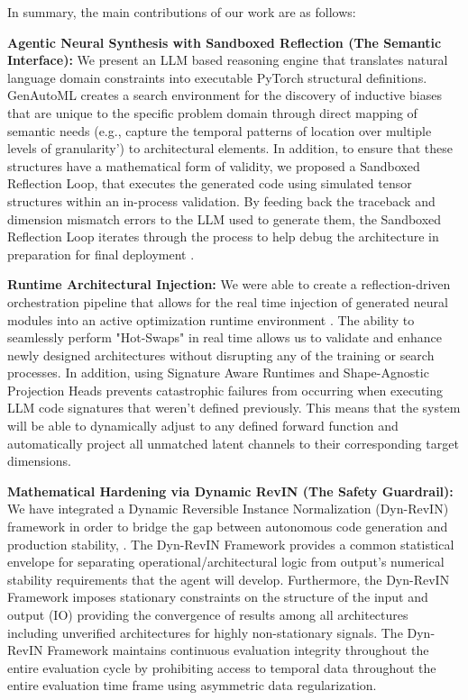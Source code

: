 \documentclass{article}
\begin{document}
In summary, the main contributions of our work are as follows:

\textbf{Agentic Neural Synthesis with Sandboxed Reflection (The Semantic Interface):} We present an LLM based reasoning engine that translates natural language domain constraints into executable PyTorch structural definitions. GenAutoML creates a search environment for the discovery of inductive biases that are unique to the specific problem domain through direct mapping of semantic needs (e.g., capture the temporal patterns of location over multiple levels of granularity') to architectural elements. In addition, to ensure that these structures have a mathematical form of validity, we proposed a Sandboxed Reflection Loop, that executes the generated code using simulated tensor structures within an in-process validation. By feeding back the traceback and dimension mismatch errors to the LLM used to generate them, the Sandboxed Reflection Loop iterates through the process to help debug the architecture in preparation for final deployment \cite{chen2023teaching}.

\textbf{Runtime Architectural Injection:} We were able to create a reflection-driven orchestration pipeline that allows for the real time injection of generated neural modules into an active optimization runtime environment \cite{paszke2019pytorch}. The ability to seamlessly perform "Hot-Swaps" in real time allows us to validate and enhance newly designed architectures without disrupting any of the training or search processes.  In addition, using Signature Aware Runtimes and Shape-Agnostic Projection Heads prevents catastrophic failures from occurring when executing LLM code signatures that weren’t defined previously. This means that the system will be able to dynamically adjust to any defined forward function and automatically project all unmatched latent channels to their corresponding target dimensions.

\textbf{Mathematical Hardening via Dynamic RevIN (The Safety Guardrail):} We have integrated a Dynamic Reversible Instance Normalization (Dyn-RevIN) framework in order to bridge the gap between autonomous code generation and production stability, \cite{kim2022reversible}. The Dyn-RevIN Framework provides a common statistical envelope for separating operational/architectural logic from output’s numerical stability requirements that the agent will develop. Furthermore, the Dyn-RevIN Framework imposes stationary constraints on the structure of the input and output (IO) providing the convergence of results among all architectures including unverified architectures for highly non-stationary signals. The Dyn-RevIN Framework maintains continuous evaluation integrity throughout the entire evaluation cycle by prohibiting access to temporal data throughout the entire evaluation time frame using asymmetric data regularization.
\end{document}
